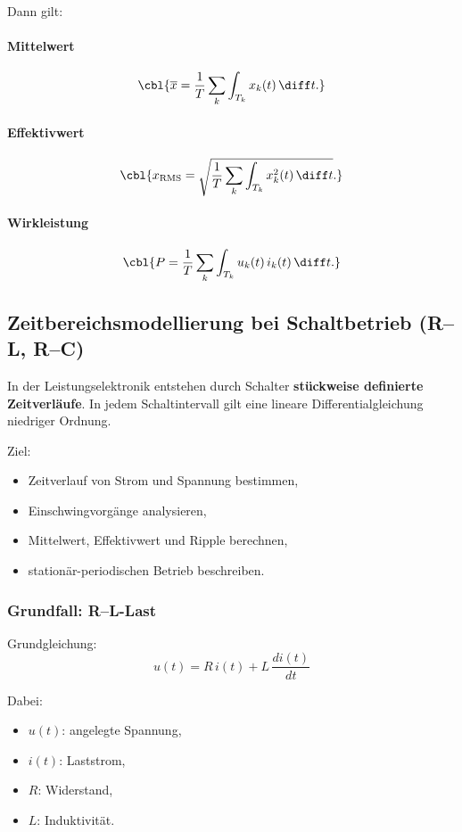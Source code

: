 Dann gilt:

\paragraph{Mittelwert}
\[
\cbl{\overline{x} = \frac{1}{T} \sum_k \int_{T_k} x_k(t)\,\diff t.}
\]

\paragraph{Effektivwert}
\[
\cbl{x_{\mathrm{RMS}} = \sqrt{ \frac{1}{T} \sum_k \int_{T_k} x_k^2(t)\,\diff t }.}
\]

\paragraph{Wirkleistung}
\[
\cbl{P = \frac{1}{T} \sum_k \int_{T_k} u_k(t)\, i_k(t)\,\diff t.}
\]


\subsection{Zeitbereichsmodellierung bei Schaltbetrieb (R--L, R--C)}

In der Leistungselektronik entstehen durch Schalter \textbf{stückweise definierte Zeitverläufe}.
In jedem Schaltintervall gilt eine lineare Differentialgleichung niedriger Ordnung.

Ziel:
\begin{itemize}
    \item Zeitverlauf von Strom und Spannung bestimmen,
    \item Einschwingvorgänge analysieren,
    \item Mittelwert, Effektivwert und Ripple berechnen,
    \item stationär-periodischen Betrieb beschreiben.
\end{itemize}


\subsubsection{Grundfall: R--L-Last}

Grundgleichung:
\[
\boxed{
u(t) = R\, i(t) + L\, \frac{di(t)}{dt}
}
\]

Dabei:
\begin{itemize}
    \item $u(t)$: angelegte Spannung,
    \item $i(t)$: Laststrom,
    \item $R$: Widerstand,
    \item $L$: Induktivität.
\end{itemize}

